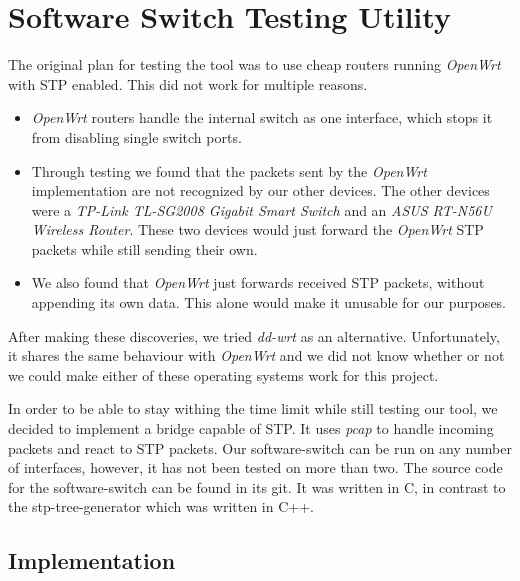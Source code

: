 \chapter{Software Switch Testing Utility}
\label{switch}
The original plan for testing the tool was to use cheap routers running \textit{OpenWrt}\cite{OpenWrt} with STP enabled.
This did not work for multiple reasons.
\begin{itemize}
    \item \textit{OpenWrt} routers handle the internal switch as one interface, which stops it from disabling single switch ports.
    \item Through testing we found that the packets sent by the \textit{OpenWrt} implementation are not recognized by our other devices.
    The other devices were a \textit{TP-Link TL-SG2008 Gigabit Smart Switch} and an \textit{ASUS RT-N56U Wireless Router}.
    These two devices would just forward the \textit{OpenWrt} STP packets while still sending their own.
    \item We also found that \textit{OpenWrt} just forwards received STP packets, without appending its own data.
    This alone would make it unusable for our purposes.
\end{itemize}

After making these discoveries, we tried \textit{dd-wrt}\cite{dd-wrt} as an alternative.
Unfortunately, it shares the same behaviour with \textit{OpenWrt} and we did not know whether or not we could make either of these operating systems work for this project.

In order to be able to stay withing the time limit while still testing our tool, we decided to implement a bridge capable of STP.
It uses \textit{pcap} to handle incoming packets and react to STP packets.
Our software-switch can be run on any number of interfaces, however, it has not been tested on more than two.
The source code for the software-switch can be found in its git\cite{software-switch}.
It was written in C, in contrast to the stp-tree-generator which was written in C++.

\section{Implementation}
